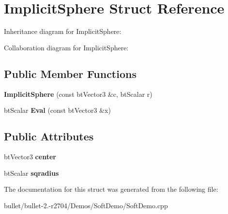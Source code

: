 \hypertarget{struct_implicit_sphere}{\section{Implicit\+Sphere Struct Reference}
\label{struct_implicit_sphere}
}


Inheritance diagram for Implicit\+Sphere\+:


Collaboration diagram for Implicit\+Sphere\+:
\subsection*{Public Member Functions}
\begin{DoxyCompactItemize}
\item 
\hypertarget{struct_implicit_sphere_ad9554e23503d944a6d236140cd55fdfe}{{\bfseries Implicit\+Sphere} (const bt\+Vector3 \&c, bt\+Scalar r)}\label{struct_implicit_sphere_ad9554e23503d944a6d236140cd55fdfe}

\item 
\hypertarget{struct_implicit_sphere_a0024b4ee4da988aac81ea4dfbef18229}{bt\+Scalar {\bfseries Eval} (const bt\+Vector3 \&x)}\label{struct_implicit_sphere_a0024b4ee4da988aac81ea4dfbef18229}

\end{DoxyCompactItemize}
\subsection*{Public Attributes}
\begin{DoxyCompactItemize}
\item 
\hypertarget{struct_implicit_sphere_ab63c5448593dd16c065798ec1800bbb7}{bt\+Vector3 {\bfseries center}}\label{struct_implicit_sphere_ab63c5448593dd16c065798ec1800bbb7}

\item 
\hypertarget{struct_implicit_sphere_ae6e89cf187fb2db2643383214ce0b3e1}{bt\+Scalar {\bfseries sqradius}}\label{struct_implicit_sphere_ae6e89cf187fb2db2643383214ce0b3e1}

\end{DoxyCompactItemize}


The documentation for this struct was generated from the following file\+:\begin{DoxyCompactItemize}
\item 
bullet/bullet-\/2.-\/r2704/\+Demos/\+Soft\+Demo/Soft\+Demo.\+cpp\end{DoxyCompactItemize}
